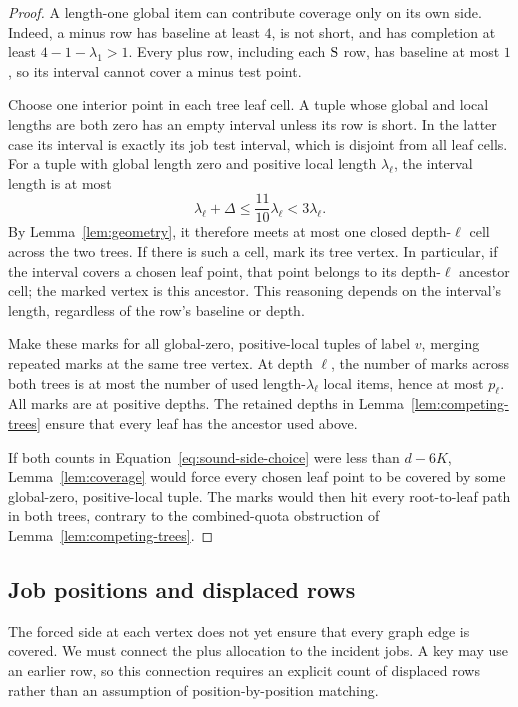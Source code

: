 \begin{proof}
A length-one global item can contribute coverage only on its own
side.  Indeed, a minus row has baseline at least \(4\), is not short,
and has completion at least \(4-1-\lambda_1>1\).
Every plus row, including each \(\mathrm{S}\) row, has baseline at most
\(1\), so its interval cannot cover a minus test point.

Choose one interior point in each tree leaf cell.  A tuple whose
global and local lengths are both zero has an empty interval unless
its row is short.  In the latter case its interval is exactly its
job test interval, which is disjoint from all leaf cells.
For a tuple with global length zero and positive local length
\(\lambda_\ell\), the interval length is at most
\[
 \lambda_\ell+\Delta\le \frac{11}{10}\lambda_\ell<3\lambda_\ell.
\]
By Lemma~\ref{lem:geometry}, it therefore meets at most one closed
depth-\(\ell\) cell across the two trees.  If there is such a cell,
mark its tree vertex.  In particular, if the interval covers a
chosen leaf point, that point belongs to its depth-\(\ell\)
ancestor cell; the marked vertex is this ancestor.
This reasoning depends on the interval's length, regardless of
the row's baseline or depth.

Make these marks for all global-zero, positive-local tuples of
label \(v\), merging repeated marks at the same tree vertex.
At depth \(\ell\), the number of marks across both trees is at most
the number of used length-\(\lambda_\ell\) local items, hence at
most \(p_\ell\).  All marks are at positive depths.  The retained
depths in Lemma~\ref{lem:competing-trees} ensure that every leaf has
the ancestor used above.

If both counts in Equation~\eqref{eq:sound-side-choice} were less
than \(d-6K\), Lemma~\ref{lem:coverage} would force every chosen
leaf point to be covered by some global-zero, positive-local tuple.
The marks would then hit every root-to-leaf path in both trees,
contrary to the combined-quota obstruction of
Lemma~\ref{lem:competing-trees}.
\end{proof}

\subsection{Job positions and displaced rows}

The forced side at each vertex does not yet ensure that every graph
edge is covered. We must connect the plus allocation to the incident
jobs. A key may use an earlier row, so this connection requires an
explicit count of displaced rows rather than an assumption of
position-by-position matching.

